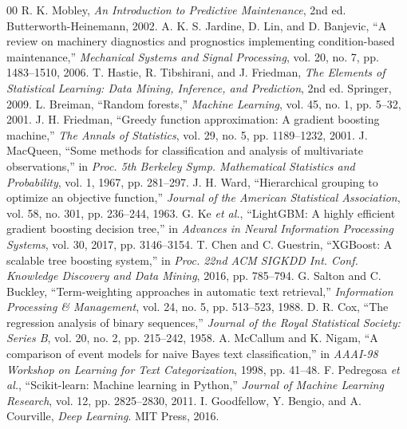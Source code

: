 \documentclass[conference]{IEEEtran}
\begin{document}
\begin{thebibliography}{00}
 R. K. Mobley, \textit{An Introduction to Predictive Maintenance}, 2nd ed. Butterworth-Heinemann, 2002.
 A. K. S. Jardine, D. Lin, and D. Banjevic, ``A review on machinery diagnostics and prognostics implementing condition-based maintenance,'' \textit{Mechanical Systems and Signal Processing}, vol. 20, no. 7, pp. 1483--1510, 2006.
 T. Hastie, R. Tibshirani, and J. Friedman, \textit{The Elements of Statistical Learning: Data Mining, Inference, and Prediction}, 2nd ed. Springer, 2009.
 L. Breiman, ``Random forests,'' \textit{Machine Learning}, vol. 45, no. 1, pp. 5--32, 2001.
 J. H. Friedman, ``Greedy function approximation: A gradient boosting machine,'' \textit{The Annals of Statistics}, vol. 29, no. 5, pp. 1189--1232, 2001.
 J. MacQueen, ``Some methods for classification and analysis of multivariate observations,'' in \textit{Proc. 5th Berkeley Symp. Mathematical Statistics and Probability}, vol. 1, 1967, pp. 281--297.
 J. H. Ward, ``Hierarchical grouping to optimize an objective function,'' \textit{Journal of the American Statistical Association}, vol. 58, no. 301, pp. 236--244, 1963.
 G. Ke \textit{et al.}, ``LightGBM: A highly efficient gradient boosting decision tree,'' in \textit{Advances in Neural Information Processing Systems}, vol. 30, 2017, pp. 3146--3154.
 T. Chen and C. Guestrin, ``XGBoost: A scalable tree boosting system,'' in \textit{Proc. 22nd ACM SIGKDD Int. Conf. Knowledge Discovery and Data Mining}, 2016, pp. 785--794.
 G. Salton and C. Buckley, ``Term-weighting approaches in automatic text retrieval,'' \textit{Information Processing \& Management}, vol. 24, no. 5, pp. 513--523, 1988.
 D. R. Cox, ``The regression analysis of binary sequences,'' \textit{Journal of the Royal Statistical Society: Series B}, vol. 20, no. 2, pp. 215--242, 1958.
 A. McCallum and K. Nigam, ``A comparison of event models for naive Bayes text classification,'' in \textit{AAAI-98 Workshop on Learning for Text Categorization}, 1998, pp. 41--48.
 F. Pedregosa \textit{et al.}, ``Scikit-learn: Machine learning in Python,'' \textit{Journal of Machine Learning Research}, vol. 12, pp. 2825--2830, 2011.
 I. Goodfellow, Y. Bengio, and A. Courville, \textit{Deep Learning}. MIT Press, 2016.
\end{thebibliography}
\end{document}
